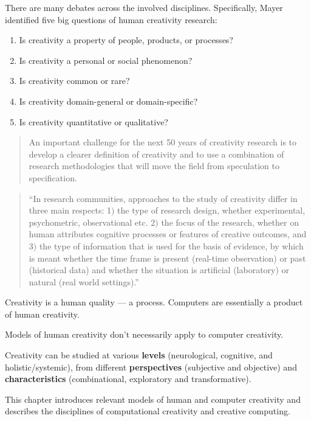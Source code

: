 There are many debates across the involved disciplines. Specifically, Mayer identified five big questions of human creativity research: \autocite[p.450-451]{Mayer1999}

\begin{enumerate}
  \item Is creativity a property of people, products, or processes?
  \item Is creativity a personal or social phenomenon?
  \item Is creativity common or rare?
  \item Is creativity domain-general or domain-specific?
  \item Is creativity quantitative or qualitative?
\end{enumerate}

\begin{quote}
  An important challenge for the next 50 years of creativity research is to develop a clearer definition of creativity and to use a combination of research methodologies that will move the field from speculation to specification. \autocite[p.459]{Mayer1999}
\end{quote}

\begin{quote}
  ``In research communities, approaches to the study of creativity differ in three main respects: 1$)$ the type of research design, whether experimental, psychometric, observational etc. 2$)$ the focus of the research, whether on human attributes cognitive processes or features of creative outcomes, and 3$)$ the type of information that is used for the basis of evidence, by which is meant whether the time frame is present (real-time observation) or past (historical data) and whether the situation is artificial (laboratory) or natural (real world settings).'' \autocite[p.3]{Candy2012}%
\end{quote}

Creativity is a human quality --- a process. Computers are essentially a product of human creativity.

Models of human creativity don't necessarily apply to computer creativity.

Creativity can be studied at various \textbf{levels} (neurological, cognitive, and holistic/systemic), from different \textbf{perspectives} (subjective and objective) and \textbf{characteristics} (combinational, exploratory and transformative).

This chapter introduces relevant models of human and computer creativity and describes the disciplines of computational creativity and creative computing.

